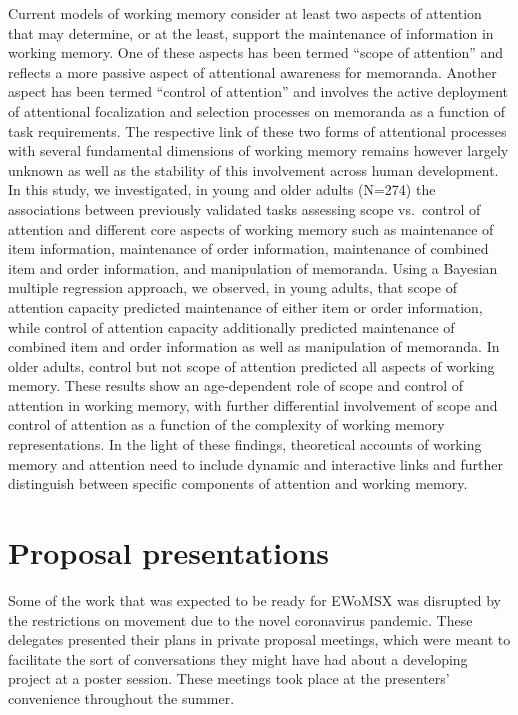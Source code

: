 \documentclass[
  12pt,
]{book}
\begin{document}
Current models of working memory consider at least two aspects of attention that may determine, or at the least, support the maintenance of information in working memory. One of these aspects has been termed ``scope of attention'' and reflects a more passive aspect of attentional awareness for memoranda. Another aspect has been termed ``control of attention'' and involves the active deployment of attentional focalization and selection processes on memoranda as a function of task requirements. The respective link of these two forms of attentional processes with several fundamental dimensions of working memory remains however largely unknown as well as the stability of this involvement across human development. In this study, we investigated, in young and older adults (N=274) the associations between previously validated tasks assessing scope vs.~control of attention and different core aspects of working memory such as maintenance of item information, maintenance of order information, maintenance of combined item and order information, and manipulation of memoranda. Using a Bayesian multiple regression approach, we observed, in young adults, that scope of attention capacity predicted maintenance of either item or order information, while control of attention capacity additionally predicted maintenance of combined item and order information as well as manipulation of memoranda. In older adults, control but not scope of attention predicted all aspects of working memory. These results show an age-dependent role of scope and control of attention in working memory, with further differential involvement of scope and control of attention as a function of the complexity of working memory representations. In the light of these findings, theoretical accounts of working memory and attention need to include dynamic and interactive links and further distinguish between specific components of attention and working memory.

\hypertarget{proposal-presentations}{%
\chapter{Proposal presentations}\label{proposal-presentations}}

Some of the work that was expected to be ready for EWoMSX was disrupted by the restrictions on movement due to the novel coronavirus pandemic. These delegates presented their plans in private proposal meetings, which were meant to facilitate the sort of conversations they might have had about a developing project at a poster session. These meetings took place at the presenters' convenience throughout the summer.
\end{document}
